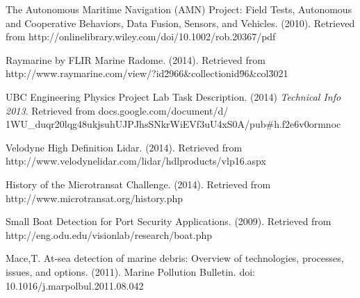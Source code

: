 \begin{thebibliography}{999}


 The Autonomous Maritime Navigation (AMN) Project:
Field Tests, Autonomous and Cooperative Behaviors,
Data Fusion, Sensors, and Vehicles. (2010). Retrieved from http://onlinelibrary.wiley.com/doi/10.1002/rob.20367/pdf

 Raymarine by FLIR Marine Radome. (2014). Retrieved from http://www.raymarine.com/view/?id\=2966\&collectionid\=96\&col\=3021

 UBC Engineering Physics Project Lab Task Description. (2014) \textit{Technical Info 2013}. Retrieved from docs.google.com/document/d/\\1WU\_duqr20lqg48ukjsuhUJPJhsSNkrWiEVf3uU4xS0A/pub\#h.f2e6v0ormnoc

 Velodyne High Definition Lidar. (2014). Retrieved from http://www.velodynelidar.com/lidar/hdlproducts/vlp16.aspx

 History of the Microtransat Challenge. (2014). Retrieved from http://www.microtransat.org/history.php

 Small Boat Detection for Port Security Applications. (2009). Retrieved from http://eng.odu.edu/visionlab/research/boat.php

 Mace,T. At-sea detection of marine debris: Overview of technologies, processes, issues, and options. (2011). Marine Pollution Bulletin. doi: 10.1016/j.marpolbul.2011.08.042

\end{thebibliography}
